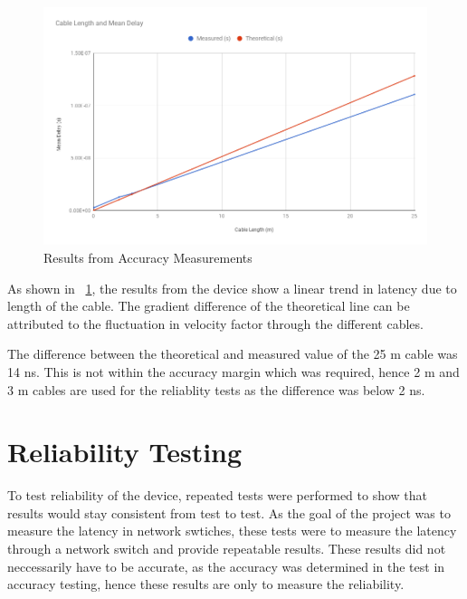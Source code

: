 \begin{figure}[H]
    \begin{center}
        \includegraphics[keepaspectratio,width=15cm]{Images/CableTesting}
        \caption{Results from Accuracy Measurements}
        \label{fig:accuracyMeasurements}
    \end{center}
\end{figure}

\par As shown in ~\ref{fig:accuracyMeasurements}, the results from the device show a linear trend in latency due to 
length of the cable. The gradient difference of the theoretical line can be attributed to the fluctuation in 
velocity factor through the different cables.

\par The difference between the theoretical and measured value of the 25 m cable was 14 ns. This is not within the 
accuracy margin which was required, hence 2 m and 3 m cables are used for the reliablity tests as the difference was below 2 ns.

\section{Reliability Testing}

\par To test reliability of the device, repeated tests were performed to show that results would stay consistent
from test to test. As the goal of the project was to measure the latency in network swtiches, these tests were to 
measure the latency through a network switch and provide repeatable results. These results did not neccessarily have
to be accurate, as the accuracy was determined in the test in accuracy testing, hence these results are only to 
measure the reliability.

